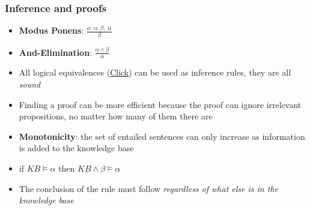 \documentclass{scrartcl}
\newcommand{\ffrac}[2]{\ensuremath{\frac{\displaystyle #1}{\displaystyle #2}}}
\begin{document}
\subsubsection{Inference and proofs}
\begin{itemize}
    \item
        \textbf{Modus Ponens}: $\ffrac{\alpha \Rightarrow \beta, \; \alpha}{\beta}$
    \item
        \textbf{And-Elimination}: $\ffrac{\alpha \land \beta}{\alpha}$
    \item
        All logical equivalences (\hyperref[logEqui]{Click}) can be used as inference rules, they are all \textit{sound}
    \item
        Finding a proof can be more efficient because the proof can ignore irrelevant propositions, no matter how many of them there are
    \item
        \textbf{Monotonicity}: the set of entailed sentences can only increase as information is added to the knowledge base
    \item
        if $KB \vDash \alpha$ then $KB \land \beta \vDash \alpha$
    \item
        The conclusion of the rule must follow \textit{regardless of what else is in the knowledge base}
\end{itemize}
\end{document}
